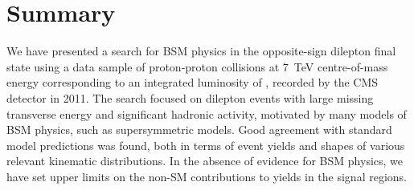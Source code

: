 \section{Summary}
\label{sec:summary}


We have presented a search for BSM physics in the opposite-sign dilepton final state using 
a data sample of proton-proton collisions at 7~TeV centre-of-mass energy corresponding to an integrated
luminosity of \lumi, recorded by the CMS detector in 2011.
The search focused on dilepton events with large missing transverse energy and significant hadronic activity,
motivated by many models of BSM physics, such as supersymmetric models.
Good agreement with standard model predictions was found, both in terms of event yields and shapes of 
various relevant kinematic distributions. In the absence of evidence for BSM physics, 
we have set upper limits on the non-SM contributions to yields in the signal regions. 
